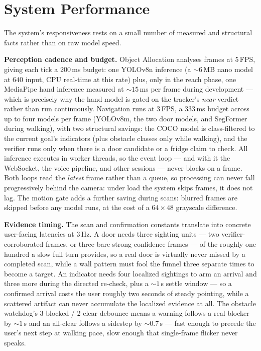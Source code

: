 \section{System Performance}
\label{sec:performance}

The system's responsiveness rests on a small number of measured and structural
facts rather than on raw model speed.

\textbf{Perception cadence and budget.} Object Allocation analyses frames at
5\,FPS, giving each tick a 200\,ms budget: one YOLOv8n inference (a ${\sim}6$\,MB
nano model at $640$ input, CPU real-time at this rate) plus, only in the reach
phase, one MediaPipe hand inference measured at ${\sim}15$\,ms per frame during
development --- which is precisely why the hand model is gated on the tracker's
\emph{near} verdict rather than run continuously. Navigation runs at 3\,FPS, a
333\,ms budget across up to four models per frame (YOLOv8m, the two door models,
and SegFormer during walking), with two structural savings: the COCO model is
class-filtered to the current goal's indicators (plus obstacle classes only while
walking), and the verifier runs only when there is a door candidate or a fridge
claim to check. All inference executes in worker threads, so the event loop ---
and with it the WebSocket, the voice pipeline, and other sessions --- never blocks
on a frame. Both loops read the \emph{latest} frame rather than a queue, so
processing can never fall progressively behind the camera: under load the system
skips frames, it does not lag. The motion gate adds a further saving during scans:
blurred frames are skipped before any model runs, at the cost of a $64\times48$
grayscale difference.

\textbf{Evidence timing.} The scan and confirmation constants translate into
concrete user-facing latencies at 3\,Hz. A door needs three sighting units ---
two verifier-corroborated frames, or three bare strong-confidence frames --- of
the roughly one hundred a slow full turn provides, so a real door is virtually
never missed by a completed scan, while a wall pattern must fool the funnel three
separate times to become a target. An indicator needs four localized sightings to
arm an arrival and three more during the directed re-check, plus a ${\sim}1$\,s
settle window --- so a confirmed arrival costs the user roughly two seconds of
steady pointing, while a scattered artifact can never accumulate the localized
evidence at all. The obstacle watchdog's 3-blocked / 2-clear debounce means a
warning follows a real blocker by ${\sim}1$\,s and an all-clear follows a sidestep
by ${\sim}0.7$\,s --- fast enough to precede the user's next step at walking pace,
slow enough that single-frame flicker never speaks.

